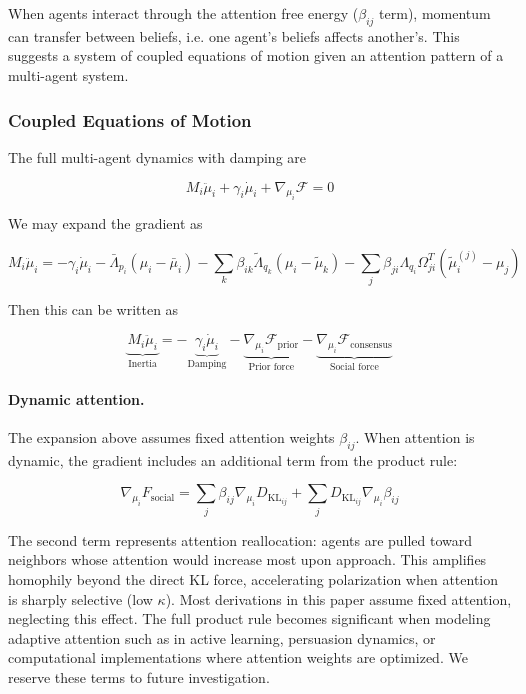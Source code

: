 \documentclass[12pt]{article}
\begin{document}
When agents interact through the attention free energy ($\beta_{ij}$ term), momentum can transfer between beliefs, i.e. one agent's beliefs affects another's. This suggests a system of coupled equations of motion given an attention pattern of a multi-agent system.

\subsubsection{Coupled Equations of Motion}

The full multi-agent dynamics with damping are

\begin{equation}
\boxed{M_i\ddot{\mu}_i + \gamma_i\dot{\mu}_i + \nabla_{\mu_i}\mathcal{F} = 0}
\end{equation}

We may expand the gradient as 

\begin{equation}
M_i\ddot{\mu}_i = -\gamma_i\dot{\mu}_i - \bar{\Lambda}_{p_i}(\mu_i - \bar{\mu}_i) - \sum_k\beta_{ik}\tilde{\Lambda}_{q_k}(\mu_i - \tilde{\mu}_k) - \sum_j\beta_{ji}\Lambda_{q_i}\Omega_{ji}^T(\tilde{\mu}_i^{(j)} - \mu_j)
\end{equation}

Then this can be written as

\begin{equation}
\boxed{\underbrace{M_i\ddot{\mu}_i}_{\text{Inertia}} = -\underbrace{\gamma_i\dot{\mu}_i}_{\text{Damping}} - \underbrace{\nabla_{\mu_i}\mathcal{F}_{\text{prior}}}_{\text{Prior force}} - \underbrace{\nabla_{\mu_i}\mathcal{F}_{\text{consensus}}}_{\text{Social force}}}
\end{equation}

\paragraph{Dynamic attention.} The expansion above assumes fixed attention weights $\beta_{ij}$. When attention is dynamic, the gradient includes an additional term from the product rule:

\begin{equation}
\nabla_{\mu_i} F_{\text{social}} = \sum_j \beta_{ij} \nabla_{\mu_i} D_{\mathrm{KL}_{ij}} + \sum_j D_{\mathrm{KL}_{ij}} \nabla_{\mu_i} \beta_{ij}
\end{equation}

The second term represents attention reallocation: agents are pulled toward neighbors whose attention would increase most upon approach. This amplifies homophily beyond the direct KL force, accelerating polarization when attention is sharply selective (low $\kappa$). Most derivations in this paper assume fixed attention, neglecting this effect. The full product rule becomes significant when modeling adaptive attention such as in active learning, persuasion dynamics, or computational implementations where attention weights are optimized. We reserve these terms to future investigation.
\end{document}
